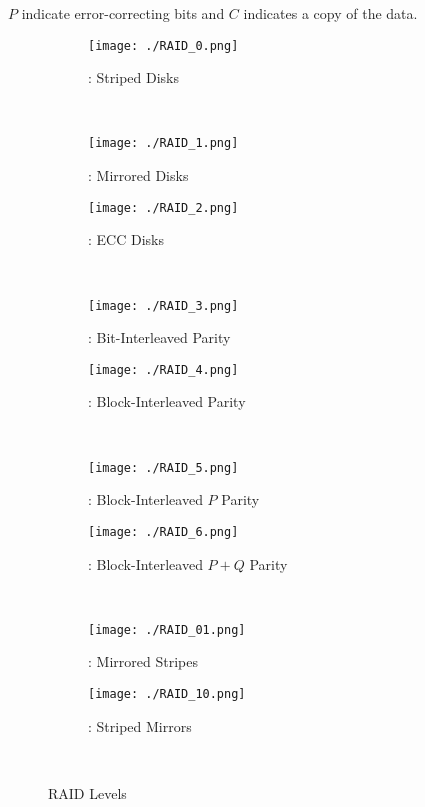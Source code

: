 $P$ indicate error-correcting bits and $C$ indicates a copy of the data.
\begin{figure}[h!tbp]
  \centering
  \begin{subfigure}{1.0\linewidth}
    \centering
    \texttt{[image: ./RAID\_0.png]}
    \caption{: Striped Disks}
    \label{subfig:RAID_0}
  \end{subfigure} \\
  \begin{subfigure}{0.45\linewidth}
    \centering
    \texttt{[image: ./RAID\_1.png]}
    \caption{: Mirrored Disks}
    \label{subfig:RAID_1}
  \end{subfigure}
  \begin{subfigure}{0.45\linewidth}
    \centering
    \texttt{[image: ./RAID\_2.png]}
    \caption{: ECC Disks}
    \label{subfig:RAID_2}
  \end{subfigure} \\
  \begin{subfigure}{0.45\linewidth}
    \centering
    \texttt{[image: ./RAID\_3.png]}
    \caption{: Bit-Interleaved Parity}
    \label{subfig:RAID_3}
  \end{subfigure}
  \begin{subfigure}{0.45\linewidth}
    \centering
    \texttt{[image: ./RAID\_4.png]}
    \caption{: Block-Interleaved Parity}
    \label{subfig:RAID_4}
  \end{subfigure} \\
  \begin{subfigure}{0.45\linewidth}
    \centering
    \texttt{[image: ./RAID\_5.png]}
    \caption{: Block-Interleaved $P$ Parity}
    \label{subfig:RAID_5}
  \end{subfigure}
  \begin{subfigure}{0.45\linewidth}
    \centering
    \texttt{[image: ./RAID\_6.png]}
    \caption{: Block-Interleaved $P+Q$ Parity}
    \label{subfig:RAID_6}
  \end{subfigure} \\
  \begin{subfigure}{0.45\linewidth}
    \centering
    \texttt{[image: ./RAID\_01.png]}
    \caption{: Mirrored Stripes}
    \label{subfig:RAID_01}
  \end{subfigure}
  \begin{subfigure}{0.45\linewidth}
    \centering
    \texttt{[image: ./RAID\_10.png]}
    \caption{: Striped Mirrors}
    \label{subfig:RAID_10}
  \end{subfigure} \\
  \caption{RAID Levels}
  \label{fig:RAID_Levels}
\end{figure}

